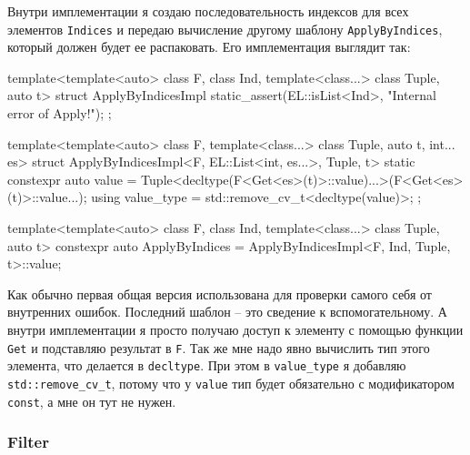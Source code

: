 Внутри имплементации я создаю последовательность индексов для всех элементов \verb"Indices" и передаю вычисление другому шаблону \verb"ApplyByIndices", который должен будет ее распаковать.
Его имплементация выглядит так:
\begin{cppcode}
template<template<auto> class F, class Ind, template<class...> class Tuple, auto t>
struct ApplyByIndicesImpl {
  static_assert(EL::isList<Ind>, "Internal error of Apply!");
};

template<template<auto> class F, template<class...> class Tuple, auto t, int... es>
struct ApplyByIndicesImpl<F, EL::List<int, es...>, Tuple, t> {
  static constexpr auto value =
      Tuple<decltype(F<Get<es>(t)>::value)...>(F<Get<es>(t)>::value...);
  using value_type = std::remove_cv_t<decltype(value)>;
};

template<template<auto> class F, class Ind, template<class...> class Tuple, auto t>
constexpr auto ApplyByIndices = ApplyByIndicesImpl<F, Ind, Tuple, t>::value;
\end{cppcode}
Как обычно первая общая версия использована для проверки самого себя от внутренних ошибок.
Последний шаблон -- это сведение к вспомогательному.
А внутри имплементации я просто получаю доступ к элементу с помощью функции \verb"Get" и подставляю результат в \verb"F".
Так же мне надо явно вычислить тип этого элемента, что делается в \verb"decltype".
При этом в \verb"value_type" я добавляю \verb"std::remove_cv_t", потому что у \verb"value" тип будет обязательно с модификатором \verb"const", а мне он тут не нужен.

\subsubsection{Filter}

